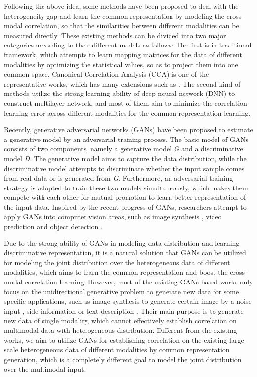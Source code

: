 \documentclass[journal]{IEEEtran}
\begin{document}
Following the above idea, some methods \cite{yang2008harmonizing,DBLP:journals/tmm/ZhuangYW08,zhang2016cross} have been proposed to deal with the heterogeneity gap and learn the common representation by modeling the cross-modal correlation, so that the similarities between different modalities can be measured directly. 
These existing methods can be divided into two major categories according to their different models as follows: 
The first is in traditional framework, which attempts to learn mapping matrices for the data of different modalities by optimizing the statistical values, so as to project them into one common space. Canonical Correlation Analysis (CCA) \cite{RasiwasiaMM10SemanticCCA} is one of the representative works, which has many extensions such as \cite{DBLP:journals/ijcv/GongKIL14,DBLP:journals/neco/HardoonSS04}. The second kind of methods \cite{DBLP:conf/ijcai/PengHQ16,feng12014cross,DBLP:journals/tmm/PangZN15} utilize the strong learning ability of deep neural network (DNN) to construct multilayer network, and most of them aim to minimize the correlation learning error across different modalities for the common representation learning.

Recently, generative adversarial networks (GANs) \cite{goodfellow2014generative} have been proposed to estimate a generative model by an adversarial training process. The basic model of GANs consists of two components, namely a generative model \textit{G} and a discriminative model \textit{D}. The generative model aims to capture the data distribution, while the discriminative model attempts to discriminate whether the input sample comes from real data or is generated from \textit{G}. Furthermore, an adversarial training strategy is adopted to train these two models simultaneously, which makes them compete with each other for mutual promotion to learn better representation of the input data. Inspired by the recent progress of GANs, researchers attempt to apply GANs into computer vision areas, such as image synthesis \cite{radford2015unsupervised}, video prediction \cite{finn2016unsupervised} and object detection \cite{li2017perceptual}. 

Due to the strong ability of GANs in modeling data distribution and learning discriminative representation, it is a natural solution that GANs can be utilized for modeling the joint distribution over the heterogeneous data of different modalities, which aims to learn the common representation and boost the cross-modal correlation learning.
However, most of the existing GANs-based works only focus on the unidirectional generative problem to generate new data for some specific applications, 
such as image synthesis to generate certain image by a noise input \cite{radford2015unsupervised}, side information \cite{mirza2014conditional} or text description \cite{reed2016generative}. Their main purpose is to generate new data of single modality, which cannot effectively establish correlation on multimodal data with heterogeneous distribution. 
Different from the existing works, we aim to utilize GANs for establishing correlation on the existing large-scale heterogeneous data of different modalities by common representation generation, which is a completely different goal to model the joint distribution over the multimodal input.
\end{document}
